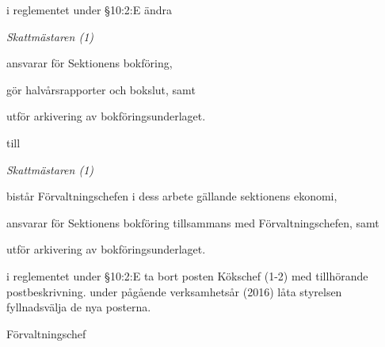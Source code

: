 \documentclass[../_main/handlingar.tex]{subfiles}
\begin{document}
\begin{attsatser}
    \att i reglementet under \S10:2:E ändra\par
    {\it
    Skattmästaren (1)
    \begin{tightdashlist}
      \item ansvarar för Sektionens bokföring,
      \item gör halvårsrapporter och bokslut, samt
      \item utför arkivering av bokföringsunderlaget.
    \end{tightdashlist}
    }
    till\par
    {\it
    Skattmästaren (1)
    \begin{tightdashlist}
    \item bistår Förvaltningschefen i dess arbete gällande sektionens ekonomi,
    \item ansvarar för Sektionens bokföring tillsammans med Förvaltningschefen, samt
    \item utför arkivering av bokföringsunderlaget.
    \end{tightdashlist}
    }

    \newpage

    \att i reglementet under \S10:2:E ta bort posten Kökschef (1-2) med tillhörande postbeskrivning.
    \att under pågående verksamhetsår (2016) låta styrelsen fyllnadsvälja de nya posterna.
\end{attsatser}

\begin{signatures}{1}
    \ist
    \signature{Anders Nilsson}{Förvaltningschef}
\end{signatures}
\end{document}
